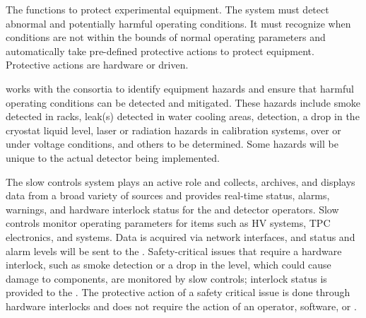 The  functions to protect experimental equipment.  The
system must detect abnormal and potentially harmful operating
conditions.  It must recognize when conditions are not within the
bounds of normal operating parameters and automatically take
pre-defined protective actions to protect equipment. Protective
actions are hardware or  driven.

  works with the consortia to identify equipment
hazards and ensure that harmful operating conditions can be detected
and mitigated.  These hazards include smoke detected in racks, leak(s)
detected in water cooling areas,  detection, a drop in the
cryostat  liquid level, laser or radiation hazards in
calibration systems, over or under voltage conditions, and others to
be determined.  Some hazards will be unique to the actual detector
being implemented.

The slow controls system plays an active role and collects, archives,
and displays data from a broad variety of sources and provides
real-time status, alarms, warnings, and hardware interlock status for
the  and detector operators. Slow controls %
monitor operating parameters for items such as HV systems, TPC electronics,
and  systems. Data is acquired via network interfaces, and status and
alarm levels will be sent to the .  Safety-critical issues that
require a hardware interlock, such as smoke detection or a drop in the
 level, which could cause  damage to components, are monitored by
slow controls; interlock status is provided to the .  The
protective action of a safety critical issue is done through hardware
interlocks and does not require the action of an operator, software, or
.

